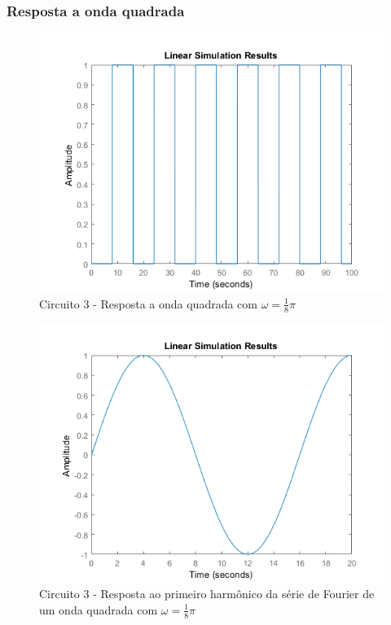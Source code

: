 \documentclass[a4paper, 12pt]{article}
\begin{document}
			\subsubsection{Resposta a onda quadrada}
			\begin{figure}[!ht]
				\centering
				\includegraphics[scale=0.71]{img/1i_circ3.png}
				\caption{Circuito 3 - Resposta a onda quadrada com $\omega = \frac{1}{8}\pi$}
			\end{figure}
			\begin{figure}[!ht]
				\centering
				\includegraphics[scale=0.71]{img/1j_circ3.png}
				\caption{Circuito 3 - Resposta ao primeiro harmônico da série de Fourier de um onda quadrada com $\omega = \frac{1}{8}\pi$}
			\end{figure}
\end{document}
